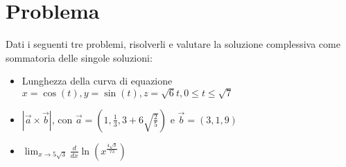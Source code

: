 
\section{Problema}
Dati i seguenti tre problemi, risolverli e valutare la soluzione complessiva come sommatoria delle singole soluzioni:

\begin{itemize}
    \item Lunghezza della curva di equazione $x = \cos(t), y = \sin(t), z = \sqrt{6}t, 0 \leq t \leq \sqrt{7}$
    \item $|\vec{a} \times \vec{b}|$, con $\vec{a} = (1, \frac{1}{3}, 3+6\sqrt{\frac{2}{5}})$ e $\vec{b} = (3, 1, 9)$
    \item $\lim_{x \rightarrow 5\sqrt{3}} \frac{d}{dx} \ln(x^{\frac{4\sqrt{3}}{73}})$
\end{itemize}